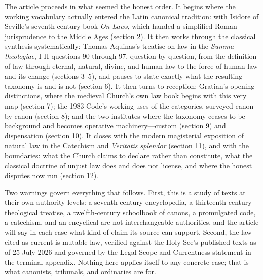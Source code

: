 The article proceeds in what seemed the honest order. It begins where the working vocabulary actually entered the Latin canonical tradition: with Isidore of Seville's seventh-century book \emph{On Laws}, which handed a simplified Roman jurisprudence to the Middle Ages (section 2). It then works through the classical synthesis systematically: Thomas Aquinas's treatise on law in the \emph{Summa theologiae}, I-II questions 90 through 97, question by question, from the definition of law through eternal, natural, divine, and human law to the force of human law and its change (sections 3--5), and pauses to state exactly what the resulting taxonomy is and is not (section 6). It then turns to reception: Gratian's opening distinctions, where the medieval Church's own law book begins with this very map (section 7); the 1983 Code's working uses of the categories, surveyed canon by canon (section 8); and the two institutes where the taxonomy ceases to be background and becomes operative machinery---custom (section 9) and dispensation (section 10). It closes with the modern magisterial exposition of natural law in the Catechism and \emph{Veritatis splendor} (section 11), and with the boundaries: what the Church claims to declare rather than constitute, what the classical doctrine of unjust law does and does not license, and where the honest disputes now run (section 12).

Two warnings govern everything that follows. First, this is a study of texts at their own authority levels: a seventh-century encyclopedia, a thirteenth-century theological treatise, a twelfth-century schoolbook of canons, a promulgated code, a catechism, and an encyclical are not interchangeable authorities, and the article will say in each case what kind of claim its source can support. Second, the law cited as current is mutable law, verified against the Holy See's published texts as of 25 July 2026 and governed by the Legal Scope and Currentness statement in the terminal appendix. Nothing here applies itself to any concrete case; that is what canonists, tribunals, and ordinaries are for.
